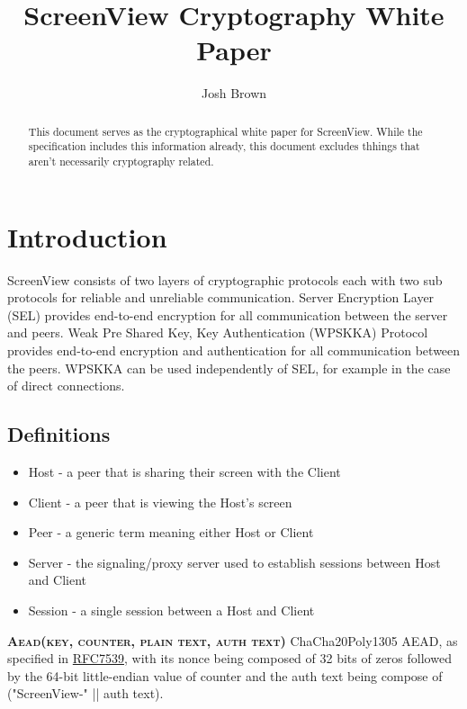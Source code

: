\documentclass{article}
\title{\textbf{ScreenView Cryptography White Paper}}
\author{Josh Brown}
\date{}
\begin{document}
    \maketitle

    \begin{abstract}
        This document serves as the cryptographical white paper for ScreenView.
        While the specification includes this information already, this document excludes thhings that aren't
        necessarily cryptography related.
    \end{abstract}

    \newpage


    \section{Introduction}

    ScreenView consists of two layers of cryptographic protocols each with two sub protocols for reliable and unreliable communication.
    Server Encryption Layer (SEL) provides end-to-end encryption for all communication between the server and peers.
    Weak Pre Shared Key, Key Authentication (WPSKKA) Protocol provides end-to-end encryption and authentication for
    all communication between the peers.
    WPSKKA can be used independently of SEL, for example in the case of direct connections.

    \subsection{Definitions}

    \begin{itemize}
        \item Host - a peer that is sharing their screen with the Client
        \item Client - a peer that is viewing the Host's screen
        \item Peer - a generic term meaning either Host or Client
        \item Server - the signaling/proxy server used to establish sessions between Host and Client
        \item Session - a single session between a Host and Client
    \end{itemize}

    \textbf{\textsc{Aead(key, counter, plain text, auth text)}} ChaCha20Poly1305 AEAD, as specified in \href{https://www.rfc-editor.org/rfc/rfc7539}{RFC7539},
    with its nonce being composed of 32 bits of zeros followed by the 64-bit little-endian value of counter and the auth
    text being compose of  ("ScreenView-" || auth text).\\
\end{document}
